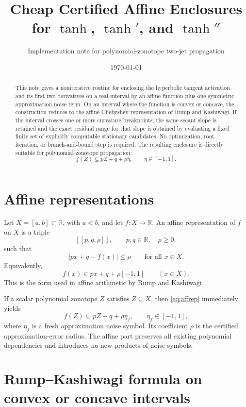 \documentclass[11pt]{article}
\title{Cheap Certified Affine Enclosures for \(\tanh\), \(\tanh'\), and \(\tanh''\)}
\author{Implementation note for polynomial-zonotope two-jet propagation}
\date{\today}
\newcommand{\R}{\mathbb{R}}
\begin{document}
\maketitle

\begin{abstract}
This note gives a noniterative routine for enclosing the hyperbolic tangent activation and its first two derivatives on a real interval by an affine function plus one symmetric approximation noise term. On an interval where the function is convex or concave, the construction reduces to the affine Chebyshev representation of Rump and Kashiwagi. If the interval crosses one or more curvature breakpoints, the same secant slope is retained and the exact residual range for that slope is obtained by evaluating a fixed finite set of explicitly computable stationary candidates. No optimization, root iteration, or branch-and-bound step is required. The resulting enclosure is directly suitable for polynomial-zonotope propagation:
\[
  f(Z)\subseteq pZ+q+\rho\eta,
  \qquad \eta\in[-1,1].
\]
\end{abstract}

\tableofcontents

\section{Affine representations}

Let \(X=[a,b]\subset\R\), with \(a<b\), and let \(f:X\to\R\). An affine representation of \(f\) on \(X\) is a triple
\[
  [[p,q,\rho]],\qquad p,q\in\R,\quad \rho\ge 0,
\]
such that
\begin{equation}\label{eq:affrep}
  |px+q-f(x)|\le \rho
  \qquad\text{for all }x\in X.
\end{equation}
Equivalently,
\[
  f(x)\in px+q+\rho[-1,1]
  \qquad (x\in X).
\]
This is the form used in affine arithmetic by Rump and Kashiwagi \cite{RumpKashiwagi2015}.

If a scalar polynomial zonotope \(Z\) satisfies \(Z\subseteq X\), then \eqref{eq:affrep} immediately yields
\begin{equation}\label{eq:pzprop}
  f(Z)\subseteq pZ+q+\rho\eta_f,
  \qquad \eta_f\in[-1,1],
\end{equation}
where \(\eta_f\) is a fresh approximation noise symbol.  Its coefficient
\(\rho\) is the certified approximation-error radius.  The affine part
preserves all existing polynomial dependencies and introduces no new products
of noise symbols.

\section{Rump--Kashiwagi formula on convex or concave intervals}
\end{document}
